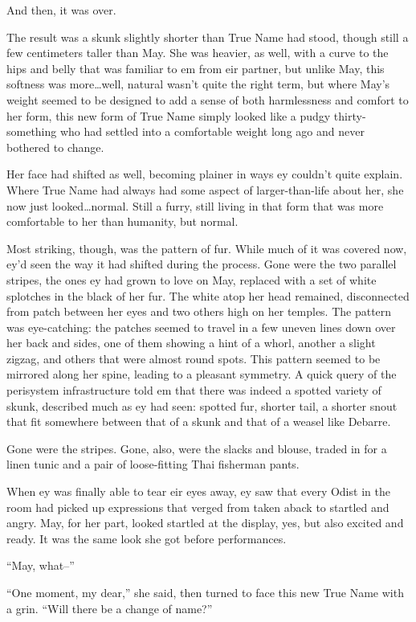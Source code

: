 And then, it was over.

The result was a skunk slightly shorter than True Name had stood, though still a few centimeters taller than May. She was heavier, as well, with a curve to the hips and belly that was familiar to em from eir partner, but unlike May, this softness was more\ldots well, natural wasn't quite the right term, but where May's weight seemed to be designed to add a sense of both harmlessness and comfort to her form, this new form of True Name simply looked like a pudgy thirty-something who had settled into a comfortable weight long ago and never bothered to change.

Her face had shifted as well, becoming plainer in ways ey couldn't quite explain. Where True Name had always had some aspect of larger-than-life about her, she now just looked\ldots normal. Still a furry, still living in that form that was more comfortable to her than humanity, but normal.

Most striking, though, was the pattern of fur. While much of it was covered now, ey'd seen the way it had shifted during the process. Gone were the two parallel stripes, the ones ey had grown to love on May, replaced with a set of white splotches in the black of her fur. The white atop her head remained, disconnected from patch between her eyes and two others high on her temples. The pattern was eye-catching: the patches seemed to travel in a few uneven lines down over her back and sides, one of them showing a hint of a whorl, another a slight zigzag, and others that were almost round spots. This pattern seemed to be mirrored along her spine, leading to a pleasant symmetry. A quick query of the perisystem infrastructure told em that there was indeed a spotted variety of skunk, described much as ey had seen: spotted fur, shorter tail, a shorter snout that fit somewhere between that of a skunk and that of a weasel like Debarre.

Gone were the stripes. Gone, also, were the slacks and blouse, traded in for a linen tunic and a pair of loose-fitting Thai fisherman pants.

When ey was finally able to tear eir eyes away, ey saw that every Odist in the room had picked up expressions that verged from taken aback to startled and angry. May, for her part, looked startled at the display, yes, but also excited and ready. It was the same look she got before performances.

``May, what--''

``One moment, my dear,'' she said, then turned to face this new True Name with a grin. ``Will there be a change of name?''


